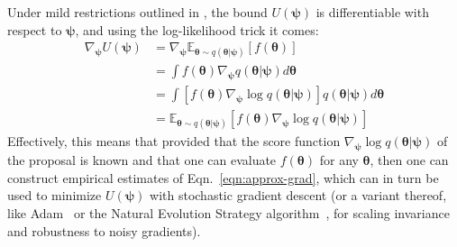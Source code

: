 \documentclass[twocolumn,superscriptaddress,aps]{revtex4-1}
\newcommand{\bftheta}{{\bm \theta}}
\newcommand{\bfpsi}{{\bm \psi}}
\theoremstyle{plain}
\begin{document}
Under mild restrictions outlined in  \citep{2012arXiv1212.4507S}, the bound
$U(\bfpsi)$ is differentiable with respect to $\bfpsi$, and using the log-likelihood
trick it comes:
\begin{align}\label{eqn:approx-grad}
    \nabla_\bfpsi U(\bfpsi) &= \nabla_\bfpsi \mathbb{E}_{\bftheta \sim q(\bftheta|\bfpsi)} [f(\bftheta)] \nonumber \\
    &= \int f(\bftheta) \nabla_\bfpsi q(\bftheta|\bfpsi)  d\bftheta \nonumber \\
    &= \int \left[ f(\bftheta) \nabla_\bfpsi \log q(\bftheta|\bfpsi) \right]  q(\bftheta|\bfpsi) d\bftheta \nonumber \\
    &= \mathbb{E}_{\bftheta \sim q(\bftheta|\bfpsi)} [f(\bftheta) \nabla_\bfpsi \log q(\bftheta|\bfpsi)]
\end{align}
Effectively, this means that provided that the score function $\nabla_\bfpsi \log
q(\bftheta|\bfpsi)$ of the proposal is known and that one can evaluate
$f(\mathbf{\bftheta})$ for any $\bftheta$, then one can construct empirical
estimates of Eqn.~\ref{eqn:approx-grad}, which can in turn be used to minimize
$U(\bfpsi)$ with stochastic gradient descent (or a variant thereof, like
Adam~\cite{2014arXiv1412.6980K} or the Natural Evolution Strategy
algorithm~\citep{2011arXiv1106.4487W}, for scaling invariance and
robustness to noisy gradients).

\end{document}

